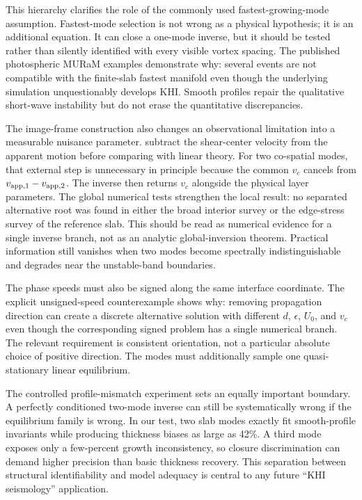 \documentclass[linenumbers]{aastex7}
\begin{document}
This hierarchy clarifies the role of the commonly used fastest-growing-mode assumption. Fastest-mode selection is not wrong as a physical hypothesis; it is an additional equation. It can close a one-mode inverse, but it should be tested rather than silently identified with every visible vortex spacing. The published photospheric MURaM examples demonstrate why: several events are not compatible with the finite-slab fastest manifold even though the underlying simulation unquestionably develops KHI. Smooth profiles repair the qualitative short-wave instability but do not erase the quantitative discrepancies.

The image-frame construction also changes an observational limitation into a measurable nuisance parameter. \citet{Kuridze2026} subtract the shear-center velocity from the apparent motion before comparing with linear theory. For two co-spatial modes, that external step is unnecessary in principle because the common $v_c$ cancels from $v_{{\rm app},1}-v_{{\rm app},2}$. The inverse then returns $v_c$ alongside the physical layer parameters. The global numerical tests strengthen the local result: no separated alternative root was found in either the broad interior survey or the edge-stress survey of the reference slab. This should be read as numerical evidence for a single inverse branch, not as an analytic global-inversion theorem. Practical information still vanishes when two modes become spectrally indistinguishable and degrades near the unstable-band boundaries.

The phase speeds must also be signed along the same interface coordinate. The explicit unsigned-speed counterexample shows why: removing propagation direction can create a discrete alternative solution with different $d$, $\epsilon$, $U_0$, and $v_c$ even though the corresponding signed problem has a single numerical branch. The relevant requirement is consistent orientation, not a particular absolute choice of positive direction. The modes must additionally sample one quasi-stationary linear equilibrium.

The controlled profile-mismatch experiment sets an equally important boundary. A perfectly conditioned two-mode inverse can still be systematically wrong if the equilibrium family is wrong. In our test, two slab modes exactly fit smooth-profile invariants while producing thickness biases as large as 42\%. A third mode exposes only a few-percent growth inconsistency, so closure discrimination can demand higher precision than basic thickness recovery. This separation between structural identifiability and model adequacy is central to any future ``KHI seismology'' application.
\end{document}
